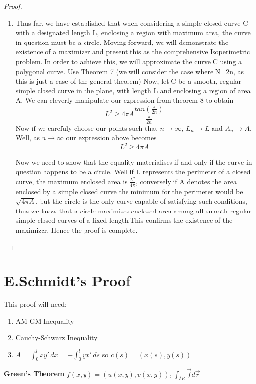 \documentclass[a4paper]{book}
\begin{document}
\begin{proof}
\begin{enumerate}
        \item Thus far, we have established that when considering a simple closed curve C with a designated length L, enclosing a region with maximum area, the curve in question must be a circle. Moving forward, we will demonstrate the existence of a maximizer and present this as the comprehensive Isoperimetric problem. In order to achieve this, we will approximate the curve C using a polygonal curve. 
        Use Theorem 7 (we will consider the case where N=2n, as this is just a case of the general theorem)
        Now, let C be a smooth, regular simple closed curve in the plane, with length L and enclosing a region of area A. 
        We can cleverly manipulate our expression from theorem 8 to obtain
        $$L^{2} \ge 4\pi A \frac{tan(\frac{\pi}{2n})}{\frac{\pi}{2n}}$$
        Now if we carefuly choose our points such that $n \to \infty $,  $L_{n} \to L$ and $A_{n} \to A$, 
        Well, as $n \to \infty$ our expression above becomes
        $$L^{2} \ge 4\pi A$$

        Now we need to show that the equality materialises if and only if the curve in question happens to be a circle. Well if L represents the perimeter of a closed curve, the maximum enclosed area is $\frac{L^{2}}{4\pi}$, conversely if A denotes the area enclosed by a simple closed curve the minimum for the perimeter would be $\sqrt{4 \pi A}$, but the circle is the only curve capable of satisfying such conditions, thus we know that a circle maximises enclosed area among all smooth regular simple closed curves of a fixed length.This confirms the existence of the maximizer. Hence the proof is complete.  
    \end{enumerate}
\end{proof}

\section{E.Schmidt's Proof}
This proof will need:
\begin{enumerate}
	\item AM-GM Inequality 
	\item Cauchy-Schwarz Inequality
	\item $A=\int_{0}^{l} xy' \,dx = -\int_{0}^{l} yx' \,ds$ so $c(s)=(x(s),y(s))$
\end{enumerate}
\textbf{Green's Theorem} $f(x,y)=(u(x,y),v(x,y))$, $\int_{\delta R}\overrightarrow{f} d\overrightarrow{r}$
\end{document}
